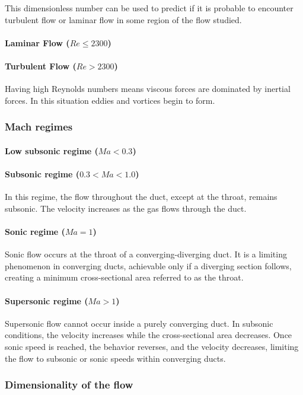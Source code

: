 This dimensionless number can be used to predict if it is probable to encounter turbulent flow or laminar flow in some region of the flow studied.
\paragraph{Laminar Flow (\(Re \le 2300\))}
\paragraph{Turbulent Flow (\(Re > 2300\))}
Having high Reynolds numbers means viscous forces are dominated by inertial forces. In this situation eddies and vortices begin to form.

\newpage
\subsubsection{Mach regimes}

\paragraph{Low subsonic regime (\(Ma < 0.3\))}

\paragraph{Subsonic regime (\(0.3 < Ma < 1.0\))} 
In this regime, the flow throughout the duct, except at the throat, remains subsonic. The velocity increases as the gas flows through the duct.\\
\paragraph{Sonic regime (\(Ma = 1\))} 
Sonic flow occurs at the throat of a converging-diverging duct. It is a limiting phenomenon in converging ducts, achievable only if a diverging section follows, creating a minimum cross-sectional area referred to as the throat.

\paragraph{Supersonic regime (\(Ma > 1\))} 
Supersonic flow cannot occur inside a purely converging duct. In subsonic conditions, the velocity increases while the cross-sectional area decreases. Once sonic speed is reached, the behavior reverses, and the velocity decreases, limiting the flow to subsonic or sonic speeds within converging ducts.\\


\newpage
\subsubsection{Dimensionality of the flow}
